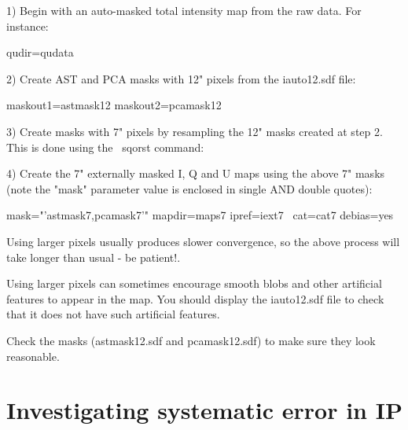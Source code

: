 1) Begin with an auto-masked total intensity map from the raw data. For instance:

\begin{terminalv}
                    qudir=qudata
\end{terminalv}


2) Create AST and PCA masks with 12" pixels from the iauto12.sdf file:


\begin{terminalv}
                   maskout1=astmask12 maskout2=pcamask12
\end{terminalv}

3) Create masks with 7" pixels by resampling the 12" masks created at
step 2. This is done using the \Kappa\ sqorst command:

\begin{terminalv}
\end{terminalv}

4) Create the 7" externally masked I, Q and U maps using the above 7"
masks (note the "mask" parameter value  is enclosed in single AND
double quotes):

\begin{terminalv}
                  mask="'astmask7,pcamask7'" mapdir=maps7 ipref=iext7  \
                  cat=cat7 debias=yes
\end{terminalv}


\begin{tip}
Using larger pixels usually produces slower convergence, so the
above process will take longer than usual - be patient!.

Using larger pixels can sometimes encourage smooth blobs and other
artificial features to appear in the map. You should display the
iauto12.sdf file to check that it does not have such artificial
features.

Check the masks (astmask12.sdf and pcamask12.sdf) to make sure
they look reasonable.
\end{tip}

\section{Investigating systematic error in IP}


